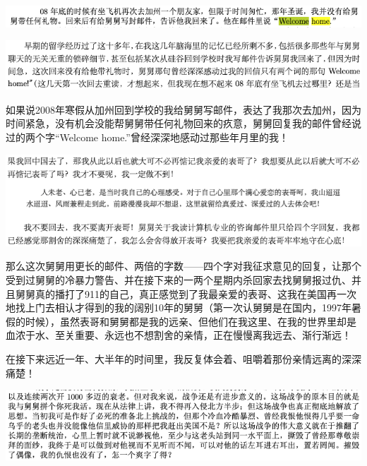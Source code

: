\documentclass[9pt, b5paper]{article}
\begin{document}
\begin{center}
\includegraphics[width=.9\linewidth]{./pic/p1p34.png}
\end{center}

\begin{center}
\includegraphics[width=.9\linewidth]{./pic/backups_plans_20210419_104535.png}
\end{center}

如果说2008年寒假从加州回到学校的我给舅舅写邮件，表达了我那次去加州，因为时间紧急，没有机会没能帮舅舅带任何礼物回来的疚意，舅舅回复我的邮件曾经说过的两个字“Welcome home.”曾经深深地感动过那些年月里的我！

\begin{center}
\includegraphics[width=.9\linewidth]{./pic/backups_plans_20210419_105423.png}
\end{center}

那么这次舅舅用更长的邮件、两倍的字数——四个字对我征求意见的回复，让那个受到过舅舅的冷暴力警告、并在接下来的一两个星期内杀回家去找舅舅报过仇、并且舅舅真的播打了911的自己，真正感觉到了我最亲爱的表哥、这我在美国再一次地找上门去相认才得到的我的阔别10年的舅舅（第一次认舅舅是在国内，1997年暑假的时候），虽然表哥和舅舅都是我的远亲、但他们在我这里、在我的世界里却是血浓于水、至关重要、永远也不想割舍的亲情，正在慢慢离我远去、渐行渐远！

在接下来远近一年、大半年的时间里，我反复体会着、咀嚼着那份亲情远离的深深痛楚！

\begin{center}
\includegraphics[width=.9\linewidth]{./pic/backups_plans_20210419_113045.png}
\end{center}
\end{document}
